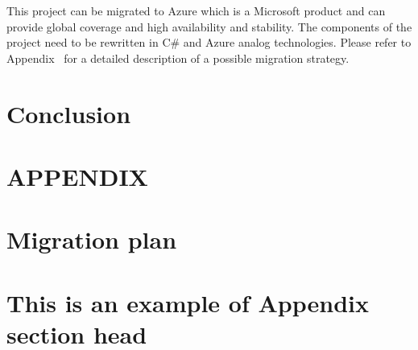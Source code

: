 \documentclass[prodmode,acmtosem]{acmsmall} %
\begin{document}
This project can be migrated to Azure which is a Microsoft product and can provide global coverage and high availability and stability. The components of the project need to be rewritten in C\# and Azure analog technologies. Please refer to Appendix~\cite{app:MigrationPlan} for a detailed description of a possible migration strategy.


\section{Conclusion}


\appendix
\section*{APPENDIX} \label{Appendix}
\setcounter{section}{1}


\begin{acks}
\end{acks}  





\elecappendix

\medskip

\section{Migration plan}
\label{app:MigrationPlan}
\section{This is an example of Appendix section head}

\pagebreak
\end{document}
